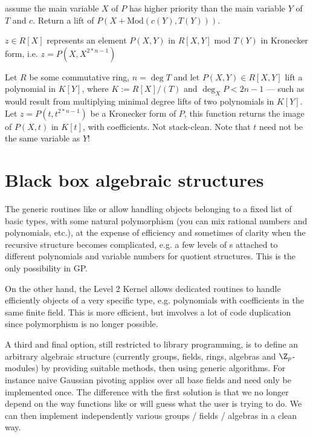 
 assume the main variable
$X$ of $P$ has higher priority than the main variable $Y$ of $T$ and $c$.
Return a lift of $P(X+\text{Mod}(c(Y), T(Y)))$.

 $z\in R[X]$ represents an element
$P(X,Y)$ in $R[X,Y]$ mod $T(Y)$ in Kronecker form, i.e. $z = P(X,X^{2*n-1})$

Let $R$ be some commutative ring, $n = \deg T$ and let $P(X,Y)\in R[X,Y]$ lift
a polynomial in $K[Y]$, where $K := R[X]/(T)$ and $\deg_X P < 2n-1$ --- such as
would result from multiplying minimal degree lifts of two polynomials in
$K[Y]$. Let $z = P(t,t^{2*n-1})$ be a Kronecker form of $P$, this function
returns the image of $P(X,t)$ in $K[t]$, with  coefficients.
Not stack-clean. Note that $t$ need not be the same variable as $Y$!

\chapter{Black box algebraic structures}

The generic routines like  or  allow handling objects
belonging to a fixed list of basic types, with some natural polymorphism
(you can mix rational numbers and polynomials, etc.), at the expense of
efficiency and sometimes of clarity when the recursive structure becomes
complicated, e.g. a few levels of s attached to different
polynomials and variable numbers for quotient structures. This
is the only possibility in GP.

On the other hand, the Level 2 Kernel allows dedicated routines to handle
efficiently objects of a very specific type, e.g. polynomials with
coefficients in the same finite field. This is more efficient, but imvolves a
lot of code duplication since polymorphism is no longer possible.

A third and final option, still restricted to library programming, is to
define an arbitrary algebraic structure (currently groups, fields, rings,
algebras and $\Z_p$-modules) by providing suitable methods, then using generic
algorithms. For instance naive Gaussian pivoting applies over all base fields
and need only be implemented once. The difference with the first solution
is that we no longer depend on the way functions like  or
 will guess what the user is trying to do. We can then implement
independently various groups / fields / algebras in a clean way.

